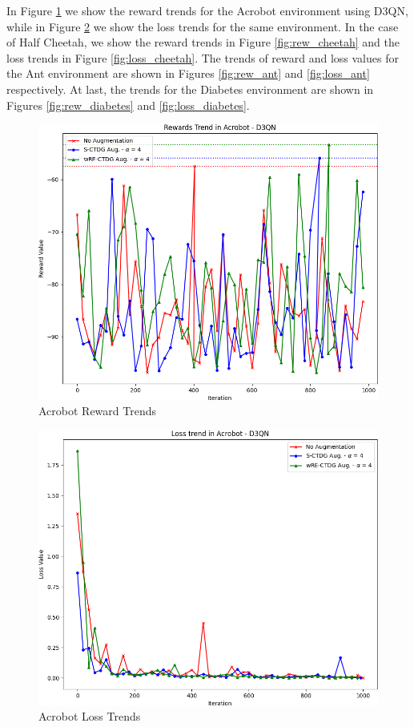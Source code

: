 In Figure \ref{fig:rew_acrobot} we show the reward trends for the
Acrobot environment using D3QN, while in Figure \ref{fig:loss_acrobot}
we show the loss trends for the same environment.
In the case of Half Cheetah, we show the reward trends in
Figure \ref{fig:rew_cheetah} and the loss trends in
Figure \ref{fig:loss_cheetah}.
The trends of reward and loss values for the Ant environment
are shown in Figures \ref{fig:rew_ant} and \ref{fig:loss_ant} respectively.
At last, the trends for the Diabetes environment are shown in
Figures \ref{fig:rew_diabetes} and \ref{fig:loss_diabetes}.

\begin{figure}[h]
    \centering
    \includegraphics[width=.8\textwidth]{figures/ch5/rew_acrobot.png}
    \caption{Acrobot Reward Trends}
    \label{fig:rew_acrobot}
\end{figure}

\begin{figure}[h]
    \centering
    \includegraphics[width=.8\textwidth]{figures/ch5/loss_acrobot.png}
    \caption{Acrobot Loss Trends}
    \label{fig:loss_acrobot}
\end{figure}

